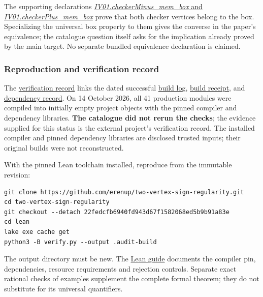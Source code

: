 \documentclass[11pt,a4paper]{article}
\begin{document}
The supporting declarations
\href{https://github.com/erenup/two-vertex-sign-regularity/blob/22fedcfb6940fd943d67f1582068ed5b9b91a83e/lean/IV01/Box.lean}{\textit{IV01.checkerMinus\_mem\_box}
and \textit{IV01.checkerPlus\_mem\_box}} prove that both checker
vertices belong to the box. Specializing the universal box property to
them gives the converse in the paper's equivalence; the catalogue
question itself asks for the implication already proved by the main
target. No separate bundled equivalence declaration is claimed.

\subsubsection{Reproduction and verification
record}\label{reproduction-and-verification-record}

The
\href{https://github.com/erenup/two-vertex-sign-regularity/blob/22fedcfb6940fd943d67f1582068ed5b9b91a83e/VERIFICATION.md}{verification
record} links the dated successful
\href{https://github.com/erenup/two-vertex-sign-regularity/blob/22fedcfb6940fd943d67f1582068ed5b9b91a83e/lean/verification/2026-10-14-build.log}{build
log},
\href{https://github.com/erenup/two-vertex-sign-regularity/blob/22fedcfb6940fd943d67f1582068ed5b9b91a83e/lean/verification/2026-10-14-receipt.json}{build
receipt}, and
\href{https://github.com/erenup/two-vertex-sign-regularity/blob/22fedcfb6940fd943d67f1582068ed5b9b91a83e/lean/verification/2026-10-14-dependencies.json}{dependency
record}. On 14 October 2026, all 41 production modules were compiled
into initially empty project objects with the pinned compiler and
dependency libraries. \textbf{The catalogue did not rerun the checks};
the evidence supplied for this status is the external project's
verification record. The installed compiler and pinned dependency
libraries are disclosed trusted inputs; their original builds were not
reconstructed.

With the pinned Lean toolchain installed, reproduce from the immutable
revision:

\begin{verbatim}
git clone https://github.com/erenup/two-vertex-sign-regularity.git
cd two-vertex-sign-regularity
git checkout --detach 22fedcfb6940fd943d67f1582068ed5b9b91a83e
cd lean
lake exe cache get
python3 -B verify.py --output .audit-build
\end{verbatim}

The output directory must be new. The
\href{https://github.com/erenup/two-vertex-sign-regularity/blob/22fedcfb6940fd943d67f1582068ed5b9b91a83e/lean/README.md}{Lean
guide} documents the compiler pin, dependencies, resource requirements
and rejection controls. Separate exact rational checks of examples
supplement the complete formal theorem; they do not substitute for its
universal quantifiers.
\end{document}
